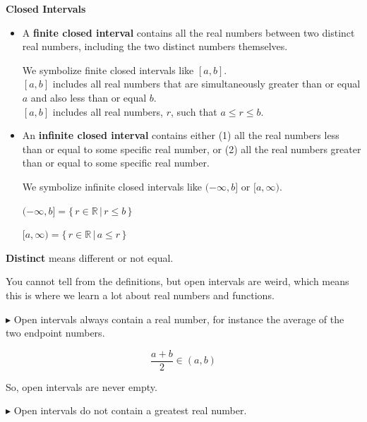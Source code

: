 \documentclass{ximera}
\begin{document}
\begin{idea} \textbf{\textcolor{blue!55!black}{Closed Intervals}} 



\begin{itemize}
\item A \textbf{finite closed interval} contains all the real numbers between two distinct real numbers, including the two distinct numbers themselves.

We symbolize finite closed intervals like $[a, b]$. \\
$[a,b]$ includes all real numbers that are simultaneously greater than or equal $a$ and also less than or equal $b$.  \\
$[a,b]$ includes all real numbers, $r$, such that $a \leq r \leq b$.



\item An \textbf{infinite closed interval} contains either (1) all the real numbers less than or equal to some specific real number, or (2) all the real numbers greater than or equal to some specific real number.

We symbolize infinite closed intervals like $(-\infty, b]$ or $[a, \infty)$.


$(-\infty, b] = \{ \, r \in \mathbb{R} \, | \,  r \leq b  \,   \}$

$[a, \infty) = \{ \, r \in \mathbb{R} \, | \,  a \leq r   \,  \}$

\end{itemize}


\end{idea}
\textbf{Distinct} means different or not equal. 









You cannot tell from the definitions, but open intervals are weird, which means this is where we learn a lot about real numbers and functions. 


$\blacktriangleright$  Open intervals always contain a real number, for instance the average of the two endpoint numbers.



\[  \frac{a+b}{2}  \in (a,b)    \]



So, open intervals are never empty.  


$\blacktriangleright$ Open intervals do not contain a greatest real number.
\end{document}
